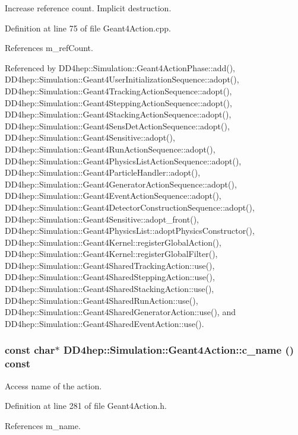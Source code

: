 Increase reference count. Implicit destruction. 

Definition at line 75 of file Geant4Action.cpp.

References m\_\-refCount.

Referenced by DD4hep::Simulation::Geant4ActionPhase::add(), DD4hep::Simulation::Geant4UserInitializationSequence::adopt(), DD4hep::Simulation::Geant4TrackingActionSequence::adopt(), DD4hep::Simulation::Geant4SteppingActionSequence::adopt(), DD4hep::Simulation::Geant4StackingActionSequence::adopt(), DD4hep::Simulation::Geant4SensDetActionSequence::adopt(), DD4hep::Simulation::Geant4Sensitive::adopt(), DD4hep::Simulation::Geant4RunActionSequence::adopt(), DD4hep::Simulation::Geant4PhysicsListActionSequence::adopt(), DD4hep::Simulation::Geant4ParticleHandler::adopt(), DD4hep::Simulation::Geant4GeneratorActionSequence::adopt(), DD4hep::Simulation::Geant4EventActionSequence::adopt(), DD4hep::Simulation::Geant4DetectorConstructionSequence::adopt(), DD4hep::Simulation::Geant4Sensitive::adopt\_\-front(), DD4hep::Simulation::Geant4PhysicsList::adoptPhysicsConstructor(), DD4hep::Simulation::Geant4Kernel::registerGlobalAction(), DD4hep::Simulation::Geant4Kernel::registerGlobalFilter(), DD4hep::Simulation::Geant4SharedTrackingAction::use(), DD4hep::Simulation::Geant4SharedSteppingAction::use(), DD4hep::Simulation::Geant4SharedStackingAction::use(), DD4hep::Simulation::Geant4SharedRunAction::use(), DD4hep::Simulation::Geant4SharedGeneratorAction::use(), and DD4hep::Simulation::Geant4SharedEventAction::use().\hypertarget{class_d_d4hep_1_1_simulation_1_1_geant4_action_a81f7a014edf0a3086149b3f45c14d826}{
\subsubsection[{c\_\-name}]{\setlength{\rightskip}{0pt plus 5cm}const char$\ast$ DD4hep::Simulation::Geant4Action::c\_\-name () const}}
\label{class_d_d4hep_1_1_simulation_1_1_geant4_action_a81f7a014edf0a3086149b3f45c14d826}


Access name of the action. 

Definition at line 281 of file Geant4Action.h.

References m\_\-name.

